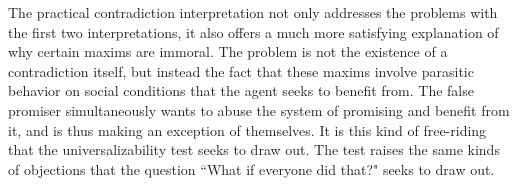 \begin{isabellebody}
\begin{isamarkuptext}
The practical contradiction interpretation not only addresses the problems with the first two 
interpretations, it also offers a much more satisfying explanation of why certain maxims are immoral. 
The problem is not the existence of a contradiction itself, but instead the fact that these maxims 
involve parasitic behavior on social conditions that the agent seeks to benefit from. The false promiser 
simultaneously wants to abuse the system of promising and benefit from it, and is thus making an exception 
of themselves. It is this kind of free-riding that the universalizability test seeks to draw out. The test
raises the same kinds of objections that the question ``What if everyone did that?" seeks to draw out.%
\end{isamarkuptext}\isamarkuptrue%
%
\isadelimtheory
%
\endisadelimtheory
%
\isatagtheory
%
\endisatagtheory
{\isafoldtheory}%
%
\isadelimtheory
%
\endisadelimtheory
%
\end{isabellebody}%
\endinput
